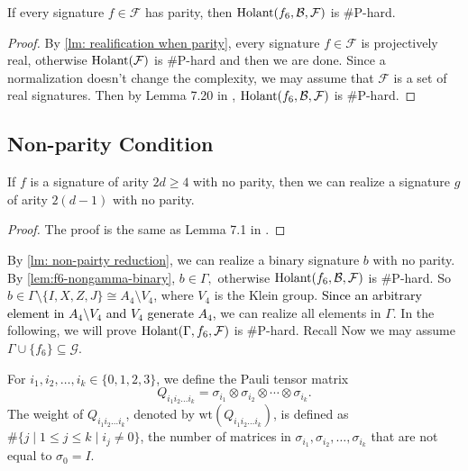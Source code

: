 \begin{lemma}\label{lm: parity f6 is hard}
    If every signature  $f\in\mathcal{F}$ has parity, then $\operatorname{Holant}(f_6,\mathcal{B},\mathcal{F})$ is \#P-hard.
\end{lemma}
\begin{proof}
    By \cref{lm: realification when parity}, every signature $f\in \mathcal{F}$ is projectively real, otherwise $\operatorname{Holant}(\mathcal{F})$ is \#P-hard and then we are done.
    Since a normalization doesn't change the complexity, we may assume that $\mathcal{F}$ is a set of real signatures.
    Then by Lemma 7.20 in \cite{realholant}, $\operatorname{Holant}(f_6,\mathcal{B},\mathcal{F})$ is \#P-hard.
\end{proof}

\subsection{Non-parity Condition}\label{subsec: f6 non-parity}

\begin{lemma}\label{lm: non-pairty reduction}
    If $f$ is a signature of arity $2d\ge 4$ with no parity, then we can realize a signature $g$ of arity $2(d-1)$ with no parity.
\end{lemma}
\begin{proof}
    The proof is the same as Lemma 7.1 in \cite{realholant}.
\end{proof}

By \cref{lm: non-pairty reduction}, we can realize a binary signature $b$ with no parity.
By \cref{lem:f6-nongamma-binary}, $b\in\Gamma,$ otherwise $\operatorname{Holant}(f_6,\mathcal{B},\mathcal{F})$ is \#P-hard.
So $b\in \Gamma\setminus \{I,X,Z,J\}\cong A_4 \setminus V_4$, where $V_4$ is the Klein group.
\textcolor{black}{Since an arbitrary element in $A_4 \setminus V_4$ and $V_4$ generate $A_4$,} we can realize all elements in $\Gamma.$
In the following, we will prove $\operatorname{Holant}(\Gamma,f_6,\mathcal{F})$ is \#P-hard.
Recall
\Fgate*
Now we may assume $\Gamma\cup \{f_6\}\subseteq \mathcal{G}.$

\begin{definition}
    For $i_1,i_2,\ldots,i_k\in \{0,1,2,3\}$, we define the Pauli tensor matrix 
    $$Q_{i_1i_2\ldots i_k}=\sigma_{i_1}\otimes \sigma_{i_2}\otimes\cdots\otimes \sigma_{i_k}.$$
    The weight of $Q_{i_1i_2\ldots i_k}$, denoted by $\mathrm{wt}(Q_{i_1i_2\ldots i_k})$, is defined as $\#\{j\mid 1\le j \le k\mid i_j\neq 0\}$, the number of matrices in $\sigma_{i_1},\sigma_{i_2},\ldots,\sigma_{i_k}$ that are not equal to $\sigma_0=I.$
\end{definition}

